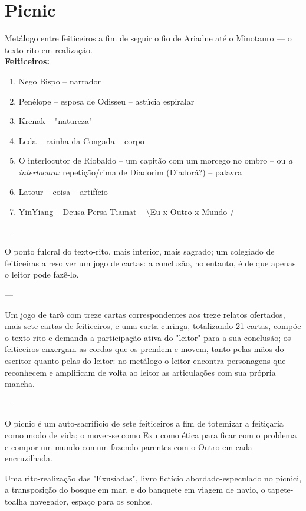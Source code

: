 \chapter{Picnic}
\label{cap:picnic}

Metálogo entre feiticeiros a fim de seguir o fio de Ariadne até o Minotauro --- o texto-rito em realização.\\

\textbf{Feiticeiros:}
\begin{enumerate}[leftmargin=3cm]
\item Nego Bispo -- narrador
\item Penélope -- esposa de Odisseu -- astúcia espiralar
\item Krenak -- "natureza"
\item Leda -- rainha da Congada -- corpo
\item O interlocutor de Riobaldo -- um capitão com um morcego no ombro -- ou \textit{a interlocura:} repetição/rima de Diadorim (Diadorá?) -- palavra
\item Latour -- coisa -- artifício
\item YinYiang -- Deusa Persa Tiamat -- \underline{\textbackslash Eu x Outro x Mundo /}
\end{enumerate}

---

O ponto fulcral do texto-rito, mais interior, mais sagrado;
    um colegiado de feiticeiras a resolver um jogo de cartas:
        a conclusão, no entanto, é de que apenas o leitor pode fazê-lo.

---

Um jogo de tarô com treze cartas correspondentes aos treze relatos ofertados, mais sete cartas de feiticeiros, e uma carta curinga, totalizando 21 cartas, compõe o texto-rito e demanda a participação ativa do "leitor" para a sua conclusão;
    os feiticeiros enxergam as cordas que os prendem e movem, tanto pelas mãos do escritor quanto pelas do leitor:
        no metálogo o leitor encontra personagens que reconhecem e amplificam de volta ao leitor as articulações com sua própria mancha.

---

O picnic é um auto-sacrifício de sete feiticeiros a fim de totemizar a feitiçaria como modo de vida;
    o mover-se como Exu como ética para ficar com o problema e compor um mundo comum fazendo parentes com o Outro em cada encruzilhada.

Uma rito-realização das "Exusíadas", livro fictício abordado-especulado no picnici, a transposição do bosque em mar, e do banquete em viagem de navio, o tapete-toalha navegador, espaço para os sonhos.